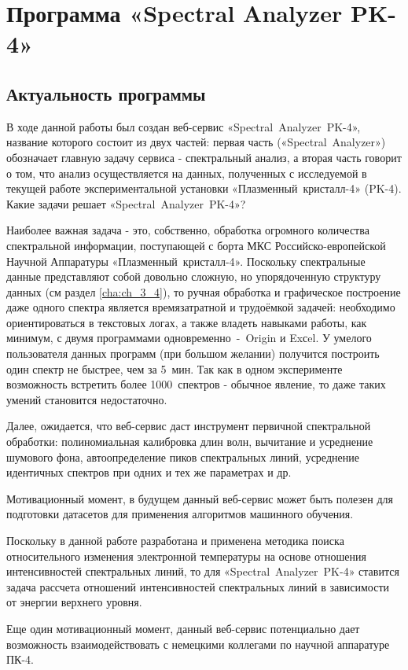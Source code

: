 \chapter{Программа «Spectral Analyzer PK-4»}
\label{cha:ch_4}
\section{Актуальность программы}
В ходе данной работы был создан веб-сервис «Spectral~Analyzer~PK-4», название которого состоит из двух частей:
первая часть («Spectral~Analyzer») обозначает главную задачу сервиса - спектральный анализ, а вторая часть говорит
о том, что анализ осуществляется на данных, полученных с исследуемой в текущей работе экспериментальной установки
«Плазменный~кристалл-4» (PK-4). Какие задачи решает «Spectral~Analyzer~PK-4»?

Наиболее важная задача - это, собственно, обработка огромного количества спектральной информации, поступающей с борта МКС
Российско-европейской Научной Аппаратуры «Плазменный~кристалл-4». Поскольку спектральные данные представляют собой
довольно сложную, но упорядоченную структуру данных (см раздел \ref{cha:ch_3_4}), то ручная обработка и
графическое построение даже одного спектра является времязатратной и трудоёмкой задачей: необходимо ориентироваться
в текстовых логах, а также владеть навыками работы, как минимум, с двумя программами одновременно~-~Origin и Exсel.
У умелого пользователя данных программ (при большом желании) получится построить один спектр не быстрее, чем за 5~мин.
Так как в одном эксперименте возможность встретить более 1000~спектров - обычное явление, то даже таких умений становится недостаточно.

Далее, ожидается, что веб-сервис даст инструмент первичной спектральной обработки: полиномиальная калибровка длин волн,
вычитание и усреднение шумового фона, автоопределение пиков спектральных линий, усреднение идентичных спектров при одних
и тех же параметрах и др.

Мотивационный момент, в будущем данный веб-сервис может быть полезен для подготовки датасетов для применения алгоритмов
машинного обучения.

Поскольку в данной работе разработана и применена методика поиска относительного изменения электронной температуры на основе
отношения интенсивностей спектральных линий, то для «Spectral~Analyzer~PK-4» ставится задача рассчета отношений интенсивностей
спектральных линий в зависимости от энергии верхнего уровня.

Еще один мотивационный момент, данный веб-сервис потенциально дает возможность взаимодействовать
с немецкими коллегами по научной аппаратуре ПК-4.


